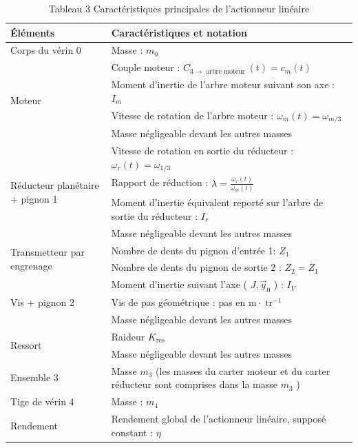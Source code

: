\documentclass[10pt]{article}
\begin{document}
\begin{table}[h]
\begin{center}
\begin{tabular}{|l|l|}
\hline
Éléments & Caractéristiques et notation \\
\hline
Corps du vérin 0 & Masse : $m_{0}$ \\
\hline
\multirow[t]{4}{*}{Moteur} & Couple moteur : $C_{3 \rightarrow \text { arbre moteur }}(t)=c_{m}(t)$ \\
\hline
 & Moment d'inertie de l'arbre moteur suivant son axe : $I_{m}$ \\
\hline
 & Vitesse de rotation de l'arbre moteur : $\omega_{m}(t)=\omega_{m / 3}$ \\
\hline
 & Masse négligeable devant les autres masses \\
\hline
\multirow[t]{4}{*}{Réducteur planétaire + pignon 1} & Vitesse de rotation en sortie du réducteur : $\omega_{r}(t)=\omega_{1 / 3}$ \\
\hline
 & Rapport de réduction : $\lambda=\frac{\omega_{r}(t)}{\omega_{m}(t)}$ \\
\hline
 & Moment d'inertie équivalent reporté sur l'arbre de sortie du réducteur : $I_{r}$ \\
\hline
 & Masse négligeable devant les autres masses \\
\hline
\multirow[t]{2}{*}{Transmetteur par engrenage} & Nombre de dents du pignon d'entrée 1: $Z_{1}$ \\
\hline
 & Nombre de dents du pignon de sortie 2 : $Z_{2}=Z_{1}$ \\
\hline
\multirow[t]{3}{*}{Vis + pignon 2} & Moment d'inertie suivant l'axe ( $J, \vec{y}_{0}$ ) : $I_{V}$ \\
\hline
 & Vis de pas géométrique : pas en $\mathrm{m} \cdot \operatorname{tr}^{-1}$ \\
\hline
 & Masse négligeable devant les autres masses \\
\hline
\multirow[t]{2}{*}{Ressort} & Raideur $K_{\text {res }}$ \\
\hline
 & Masse négligeable devant les autres masses \\
\hline
Ensemble 3 & Masse $m_{3}$ (les masses du carter moteur et du carter réducteur sont comprises dans la masse $m_{3}$ ) \\
\hline
Tige de vérin 4 & Masse : $m_{4}$ \\
\hline
Rendement & Rendement global de l'actionneur linéaire, supposé constant : $\eta$ \\
\hline
\end{tabular}
\captionsetup{labelformat=empty}
\caption{Tableau 3 Caractéristiques principales de l'actionneur linéaire}
\end{center}
\end{table}
\end{document}
